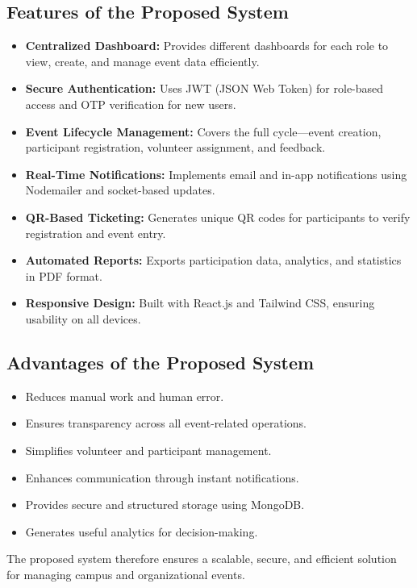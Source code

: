 \documentclass[12pt,a4paper]{report}
\begin{document}
\subsection*{Features of the Proposed System}
\begin{itemize}
    \item \textbf{Centralized Dashboard:} Provides different dashboards for each role to view, create, and manage event data efficiently.
    \item \textbf{Secure Authentication:} Uses JWT (JSON Web Token) for role-based access and OTP verification for new users.
    \item \textbf{Event Lifecycle Management:} Covers the full cycle—event creation, participant registration, volunteer assignment, and feedback.
    \item \textbf{Real-Time Notifications:} Implements email and in-app notifications using Nodemailer and socket-based updates.
    \item \textbf{QR-Based Ticketing:} Generates unique QR codes for participants to verify registration and event entry.
    \item \textbf{Automated Reports:} Exports participation data, analytics, and statistics in PDF format.
    \item \textbf{Responsive Design:} Built with React.js and Tailwind CSS, ensuring usability on all devices.
\end{itemize}

\subsection*{Advantages of the Proposed System}
\begin{itemize}
    \item Reduces manual work and human error.
    \item Ensures transparency across all event-related operations.
    \item Simplifies volunteer and participant management.
    \item Enhances communication through instant notifications.
    \item Provides secure and structured storage using MongoDB.
    \item Generates useful analytics for decision-making.
\end{itemize}

The proposed system therefore ensures a scalable, secure, and efficient solution for managing campus and organizational events.
\end{document}
